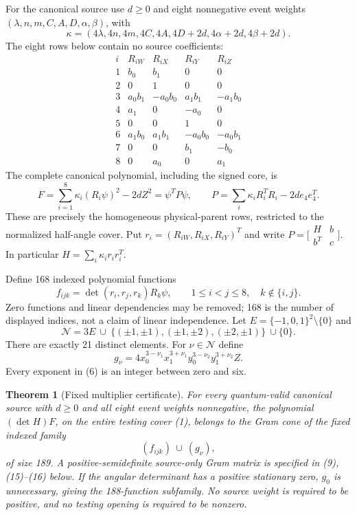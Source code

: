 \documentclass[11pt]{article}
\newtheorem{theorem}{Theorem}
\begin{document}
For the canonical source use $d\geq0$ and eight nonnegative event weights
$(\lambda,n,m,C,A,D,\alpha,\beta)$, with
\[
 \kappa=(4\lambda,4n,4m,4C,4A,4D+2d,4\alpha+2d,4\beta+2d).
\]
The eight rows below contain no source coefficients:
\[
\begin{array}{c|rrrr}
i&R_{iW}&R_{iX}&R_{iY}&R_{iZ}\\\hline
1&b_0&b_1&0&0\\
2&0&1&0&0\\
3&a_0b_1&-a_0b_0&a_1b_1&-a_1b_0\\
4&a_1&0&-a_0&0\\
5&0&0&1&0\\
6&a_1b_0&a_1b_1&-a_0b_0&-a_0b_1\\
7&0&0&b_1&-b_0\\
8&0&a_0&0&a_1
\end{array}                                                        \tag{2}
\]
The complete canonical polynomial, including the signed core, is
\[
 F=\sum_{i=1}^8\kappa_i(R_i\psi)^2-2dZ^2
   =\psi^TP\psi,\qquad
 P=\sum_i\kappa_iR_i^TR_i-2d e_4e_4^T.                \tag{3}
\]
These are precisely the homogeneous physical-parent rows, restricted to
the normalized half-angle cover.  Put $r_i=(R_{iW},R_{iX},R_{iY})^T$ and
write $P=\bigl[\begin{smallmatrix}H&b\\b^T&c\end{smallmatrix}\bigr]$.
In particular $H=\sum_i\kappa_i r_ir_i^T$.

Define 168 indexed polynomial functions
\[
 f_{ijk}=\det(r_i,r_j,r_k)R_k\psi,
 \qquad 1\leq i<j\leq8,\quad k\notin\{i,j\}.          \tag{4}
\]
Zero functions and linear dependencies may be removed; 168 is the
number of displayed indices, not a claim of linear independence.
Let $E=\{-1,0,1\}^2\setminus\{0\}$ and
\[
 \mathcal N=3E\ \cup\
 \{(\pm1,\pm1),(\pm1,\pm2),(\pm2,\pm1)\}\ \cup\{0\}.
                                                               \tag{5}
\]
There are exactly 21 distinct elements.  For $\nu\in\mathcal N$ define
\[
 g_\nu=4x_0^{3-\nu_1}x_1^{3+\nu_1}
           y_0^{3-\nu_2}y_1^{3+\nu_2}Z.                \tag{6}
\]
Every exponent in (6) is an integer between zero and six.

\begin{theorem}[Fixed multiplier certificate]
For every quantum-valid canonical source with $d\geq0$ and all eight
event weights nonnegative, the polynomial $(\det H)F$, on the entire
testing cover (1), belongs to the Gram cone of the fixed indexed family
\[
                    (f_{ijk})\ \cup\ (g_\nu),          \tag{7}
\]
of size 189.  A positive-semidefinite source-only Gram matrix is specified
in (9), (15)--(16) below.  If the angular determinant has a positive
stationary zero, $g_0$ is unnecessary, giving the 188-function subfamily.
No source weight is required to be positive, and no testing opening is
required to be nonzero.
\end{theorem}
\end{document}

